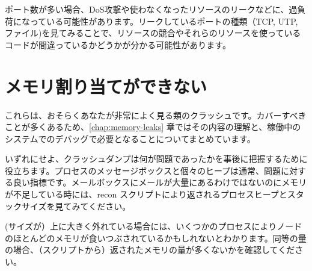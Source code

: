 ポート数が多い場合、DoS攻撃や使わなくなったリソースのリークなどに、過負荷になっている可能性があります。リークしているポートの種類（TCP, UTP, ファイル)を見てみることで、リソースの競合やそれらのリソースを使っているコードが間違っているかどうかが分かる可能性があります。

\section{メモリ割り当てができない}

これらは、おそらくあなたが非常によく見る類のクラッシュです。カバーすべきことが多くあるため、\ref{chap:memory-leaks} 章ではその内容の理解と、稼働中のシステムでのデバッグで必要となることについてまとめています。

いずれにせよ、クラッシュダンプは何が問題であったかを事後に把握するために役立ちます。プロセスのメッセージボックスと個々のヒープは通常、問題に対する良い指標です。メールボックスにメールが大量にあるわけではないのにメモリが不足している時には、recon スクリプトにより返されるプロセスヒープとスタックサイズを見てみてください。

(サイズが）上に大きく外れている場合には、いくつかのプロセスによりノードのほとんどのメモリが食いつぶされているかもしれないとわかります。同等の量の場合、（スクリプトから）返されたメモリの量が多くないかを確認してください。

